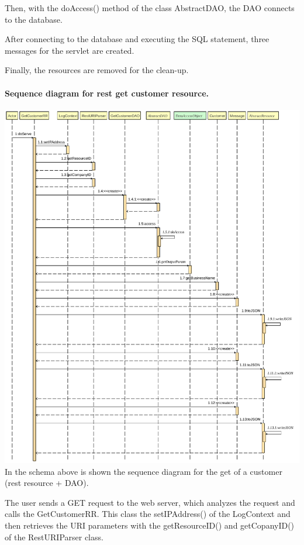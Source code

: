 Then, with the doAccess() method of the class AbstractDAO, the DAO connects to the database.

After connecting to the database and executing the SQL statement, three messages for the servlet are created.

Finally, the resources are removed for the clean-up.
\pagebreak
\paragraph[]{Sequence diagram for rest get customer resource.} \hspace{1mm} \par
\includegraphics[width=\textwidth, keepaspectratio]{resources/getcustomersequence.pdf}
In the schema above is shown the sequence diagram for the get of a customer (rest resource + DAO). 

The user sends a GET request to the web server, which analyzes the request and calls the GetCustomerRR. This class the setIPAddress() of the LogContext and then retrieves the URI parameters with the getResourceID() and getCopanyID() of the RestURIParser class.

